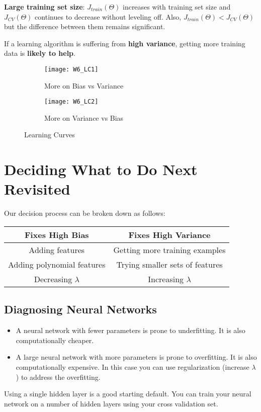 \textbf{Large training set size}: $J_{train}(\Theta)$ increases with training set size and $J_{CV}(\Theta)$ continues to decrease without leveling off. Also, $J_{train}(\Theta)<J_{CV}(\Theta)$ but the difference between them remains significant.

If a learning algorithm is suffering from \textbf{high variance}, getting more training data is \textbf{likely to help}.
\begin{figure}[ht]
     \centering
     \begin{subfigure}[b]{0.47\textwidth}
         \centering
         \texttt{[image: W6\_LC1]}
         \caption{More on Bias vs Variance}
         \label{fig:W6_LC1}
     \end{subfigure}
     \hfill
     \begin{subfigure}[b]{0.47\textwidth}
         \centering
         \texttt{[image: W6\_LC2]}
         \caption{More on Variance vs Bias}
         \label{fig:W6_LC2}
     \end{subfigure}
     \caption{Learning Curves}
     \label{fig:W6_LC}
\end{figure}

\section{Deciding What to Do Next Revisited}
Our decision process can be broken down as follows:
\begin{center}
\begin{tabular}{|c|c|}
\hline 
\textbf{Fixes High Bias} & \textbf{Fixes High Variance} \\ 
\hline 
Adding features & Getting more training examples \\ 
\hline 
Adding polynomial features & Trying smaller sets of features \\ 
\hline 
Decreasing $\lambda$ & Increasing $\lambda$ \\ 
\hline 
\end{tabular} 
\end{center}
\subsection{Diagnosing Neural Networks}
\begin{itemize}
\item A neural network with fewer parameters is prone to underfitting. It is also computationally cheaper.
\item A large neural network with more parameters is prone to overfitting. It is also computationally expensive. In this case you can use regularization (increase $\lambda$) to address the overfitting.
\end{itemize}
Using a single hidden layer is a good starting default. You can train your neural network on a number of hidden layers using your cross validation set.

